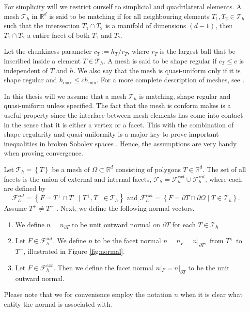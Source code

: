 For simplicity will we restrict ourself to simplicial and quadrilateral elements.
A mesh $\mathcal{T}_{h}$ in $ \mathbb{R} ^{d}$ is said to be matching if
for all neighbouring elements $T_{1}, T_{2} \in \mathcal{T} _{h}$ such that the intersection $T_{1} \cap T_{2} $ is a manifold of dimensions $( d-1)$, then $T_{1} \cap T_{2} $ a entire facet of both $T_{1}$ and $T_{2}$.

Let the chunkiness parameter $c_{T} := h_{T}/r_{T}$, where $r_{T}$  is the largest ball that be inscribed inside a element $T \in \mathcal{T}_{h} $.
A mesh is said to be shape regular if $c_{T}\le  c$ is independent of $T$  and $h$. We also say that the mesh is quasi-uniform only if it is shape regular and $h_{\mathrm{ max }} \le  c h_{\mathrm{ min }}$.
For a more complete description of meshes, see \cite[Chapter 8]{ErnGuermond2021}.

In this thesis will we assume that a mesh $\mathcal{T}_{h} $ is matching, shape regular and quasi-uniform unless specified.
 The fact that the mesh is conform makes is a useful property since the interface between mesh elements has come into contact in the sense
that it is either a vertex or a facet. This with the combination of shape regularity and quasi-uniformity is a major key to prove important inequalities in broken Sobolev spaces \cite[Chapter 1.4.1]{pietro2012}. Hence, the assumptions are very handy when proving convergence.


Let $\mathcal{T}_{h}  = \left\{ T \right\} $ be a mesh of $\Omega \subset  \mathbb{R} ^d $ consisting of polygons $T \in \mathbb{R} ^{d}$.
The set of all facets is the union of external and internal facets, $\mathcal{F} _{h} = \mathcal{F} ^{ext}_{h} \cup \mathcal{F} _{h}^{int} $, where each are defined by
\[
            \mathcal{F}^{int} _{h}  = \left\{ F=T^{+}\cap T^{-}  \mid  T^{+}, T^{-} \in \mathcal{T}_{h}  \right\} \text{ and }
            \mathcal{F}^{ext} _{h}  = \left\{ F= \partial T \cap \partial \Omega    \mid  T  \in \mathcal{T}_{h}  \right\}.
\]
Assume $T^{+} \neq T^{-}$ . Next, we define the following normal vectors.
\begin{enumerate}[label=\arabic*)]
    \item We define $ n= n  _{\partial T}$ to be unit outward normal on $\partial T$ for each $T \in \mathcal{T}_{h} $
\item Let $F \in \mathcal{F }^{int} _{h}$. We define $n$ to be the facet normal $ n =  n _F = n | _{\partial T^{+}} $  from $T^{+}$ to $T^{-}$, illustrated in Figure \ref{fig:normal}. 
 \item Let $F \in \mathcal{F} ^{ext}_{h}$. Then we define the facet normal $n | _{F} = n | _{\partial T} $ to be the unit outward normal.
\end{enumerate}
Please note that we for convenience employ the notation $n$ when it is clear what entity the normal is associated with.

